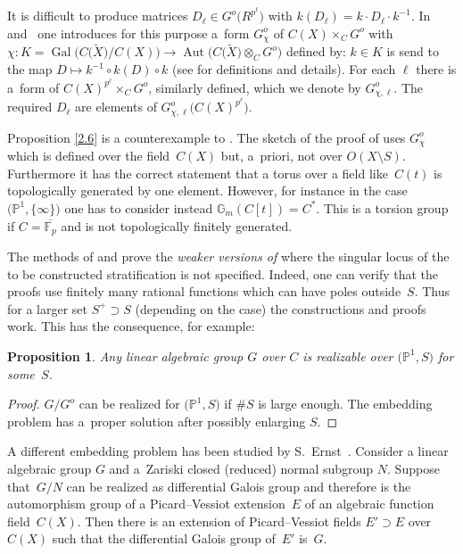 \documentclass[10pt,a4paper]{amsart}
\numberwithin{equation}{section}
\newtheorem{Proposition}[Theorem]{Proposition}
\begin{document}
It is difficult to produce matrices $D_\ell\in G^o\big(R^{p^\ell}\big)$ with $k(D_\ell)=k\cdot D_\ell \cdot k^{-1}$. In~\cite{Ma} and~\cite{Ma-vdP2} one introduces for this purpose a~form $G^o_{\chi}$ of $C(X)\times _CG^o$ with $\chi\colon K=\operatorname{Gal}\big(C\big(\tilde{X}\big)/C(X)\big)\rightarrow \operatorname{Aut}\big(C\big(\tilde{X}\big)\otimes _CG^o\big)$ defined by: $k\in K$ is send to the map $D\mapsto k^{-1}\circ k(D)\circ k$ (see \cite[Section~11.3]{Sp} for definitions and details). For each $\ell$ there is a~form of $C(X)^{p^\ell}\times _CG^o$, similarly defined, which we denote by $G^o_{\chi , \ell}$. The required $D_\ell $ are elements of $G^o_{\chi, \ell}\big(C(X)^{p^\ell}\big)$.

Proposition \ref{2.6} is a counterexample to \cite[Proposition~8.7, Theorems~8.8 and 8.11]{Ma-vdP2}. The sketch of the proof of \cite[Proposition~8.7]{Ma-vdP2} uses $G^o_{\chi}$ which is defined over the field~$C(X)$ but, a~priori, not over $O(X\setminus S)$. Furthermore it has the correct statement that a torus over a field like~$C(t)$ is topologically generated by one element. However, for instance in the case $\big(\mathbb{P}^1,\{\infty \}\big)$ one has to consider instead $\mathbb{G}_m(C[t])=C^*$. This is a torsion group if $C=\overline{\mathbb{F}_p}$ and is not topologically finitely generated.

The methods of \cite[Section~8]{Ma} and \cite[Section~8]{Ma-vdP2} prove the {\it weaker versions of} \cite[Proposition~8.7, Theorems~8.8 and 8.11]{Ma-vdP2} where the singular locus of the to be constructed stratification is not specified. Indeed, one can verify that the proofs use finitely many rational functions which can have poles outside~$S$. Thus for a larger set $S^+\supset S$ (depending on the case) the constructions and proofs work. This has the consequence, for example:
 \begin{Proposition}\label{2.9} Any linear algebraic group $G$ over $C$ is realizable over $\big(\mathbb{P}^1,S\big)$ for some~$S$.
\end{Proposition}
\begin{proof} $G/G^o$ can be realized for $\big(\mathbb{P}^1,S\big)$ if $\#S$ is large enough. The embedding problem has a~proper solution after possibly enlarging $S$.
\end{proof}

A different embedding problem has been studied by S.~Ernst~\cite{Er}. Consider a linear algebraic group $G$ and a~Zariski closed (reduced) normal subgroup $N$. Suppose that~$G/N$ can be realized as differential Galois group and therefore is the automorphism group of a Picard--Vessiot extension~$E$ of an algebraic function field~$C(X)$. Then there is an extension of Picard--Vessiot fields $E'\supset E$ over $C(X)$ such that the differential Galois group of~$E'$ is~$G$.
\end{document}
